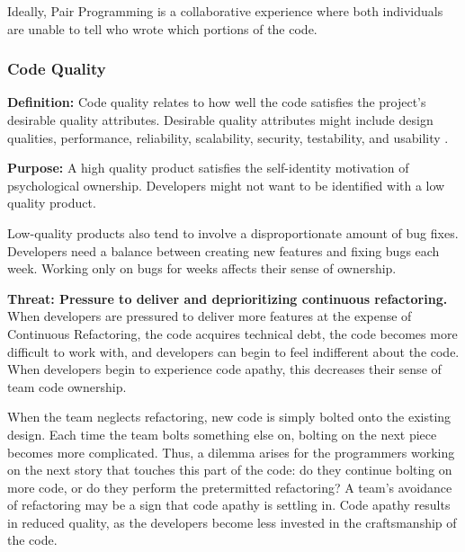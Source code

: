 

Ideally, Pair Programming is a collaborative experience where both individuals are unable to tell who wrote which portions of the code. 

\subsubsection{Code Quality}
\textbf{Definition:} Code quality relates to how well the code satisfies the project’s desirable quality attributes. Desirable quality attributes might include design qualities, performance, reliability, scalability, security,  testability, and usability \cite{Meier2009}. 

\textbf{Purpose:} A high quality product satisfies the self-identity motivation of psychological ownership. Developers might not want to be identified with a low quality product.

Low-quality products also tend to involve a disproportionate amount of bug fixes. Developers need a balance between creating new features and fixing bugs each week. Working only on bugs for weeks affects their sense of ownership.    

\textbf{Threat: Pressure to deliver and deprioritizing continuous refactoring.} When developers are pressured to deliver more features at the expense of Continuous Refactoring, the code acquires technical debt, the code becomes more difficult to work with, and developers can begin to feel indifferent about the code. When developers begin to experience code apathy, this decreases their sense of team code ownership. 

When the team neglects refactoring, new code is simply bolted onto the existing design. Each time the team bolts something else on, bolting on the next piece becomes more complicated. Thus, a dilemma arises for the programmers working on the next story that touches this part of the code: do they continue bolting on more code, or do they perform the pretermitted refactoring? A team’s avoidance of refactoring may be a sign that code apathy is settling in. Code apathy results in reduced quality, as the developers become less invested in the craftsmanship of the code.

